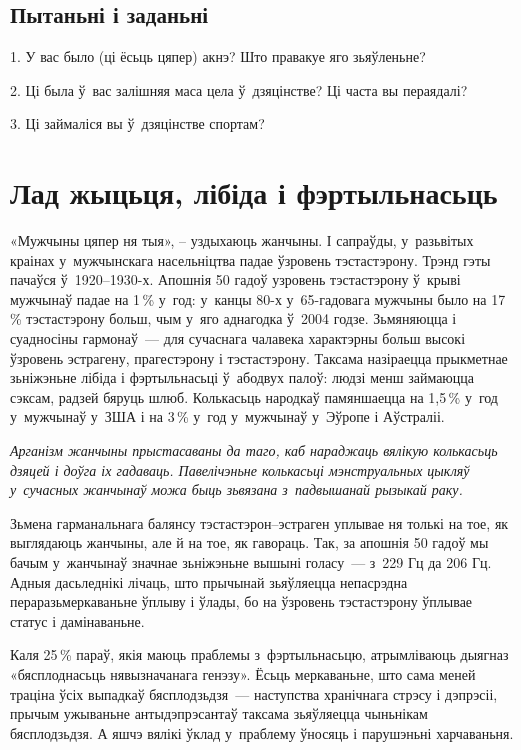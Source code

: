 \subsection*{Пытаньні і заданьні}

1. У вас было (ці ёсьць цяпер) акнэ? Што правакуе яго зьяўленьне?

2. Ці была ў~вас залішняя маса цела ў~дзяцінстве? Ці часта вы пераядалі?

3. Ці займаліся вы ў~дзяцінстве спортам?


\section{Лад жыцьця, лібіда і фэртыльнасьць}

«Мужчыны цяпер ня тыя», -- уздыхаюць жанчыны. І сапраўды, у~разьвітых краінах у~мужчынскага насельніцтва падае ўзровень тэстастэрону. Трэнд гэты пачаўся ў~1920--1930-х. Апошнія 50 гадоў узровень тэстастэрону ў~крыві мужчынаў падае на 1\,\% у~год: у~канцы 80-х у~65-гадовага мужчыны было на 17\,\% тэстастэрону больш, чым у~яго аднагодка ў~2004 годзе. Зьмяняюцца і суадносіны гармонаў~--- для сучаснага чалавека характэрны больш высокі ўзровень эстрагену, прагестэрону і тэстастэрону. Таксама назіраецца прыкметнае зьніжэньне лібіда і фэртыльнасьці ў~абодвух палоў: людзі менш займаюцца сэксам, радзей бяруць шлюб. Колькасьць народкаў памяншаецца на 1,5\,\% у~год у~мужчынаў у~ЗША і на 3\,\% у~год у~мужчынаў у~Эўропе і Аўстраліі.

\emph{Арганізм жанчыны прыстасаваны да таго, каб нараджаць вялікую колькасьць дзяцей і доўга іх гадаваць. Павелічэньне колькасьці мэнструальных цыкляў у~сучасных жанчынаў можа быць зьвязана з~падвышанай рызыкай раку.}

Зьмена гарманальнага балянсу тэс\-тас\-тэ\-рон--эстраген уплывае ня толькі на тое, як выглядаюць жанчыны, але й на тое, як гавораць. Так, за апошнія 50 гадоў мы бачым у~жанчынаў значнае зьніжэньне вышыні голасу~--- з~229 Гц да 206 Гц. Адныя дасьледнікі лічаць, што прычынай зьяўляецца непасрэдна пераразьмеркаваньне ўплыву і ўлады, бо на ўзровень тэстастэрону ўплывае статус і дамінаваньне.

Каля 25\,\% параў, якія маюць праблемы з~фэртыльнасьцю, атрымліваюць дыягназ «бясплоднасьць нявызначанага генэзу». Ёсьць меркаваньне, што сама меней траціна ўсіх выпадкаў бясплодзьдзя~--- наступства хранічнага стрэсу і дэпрэсіі, прычым ужываньне антыдэпрэсантаў таксама зьяўляецца чыньнікам бясплодзьдзя. А яшчэ вялікі ўклад у~праблему ўносяць і парушэньні харчаваньня.

